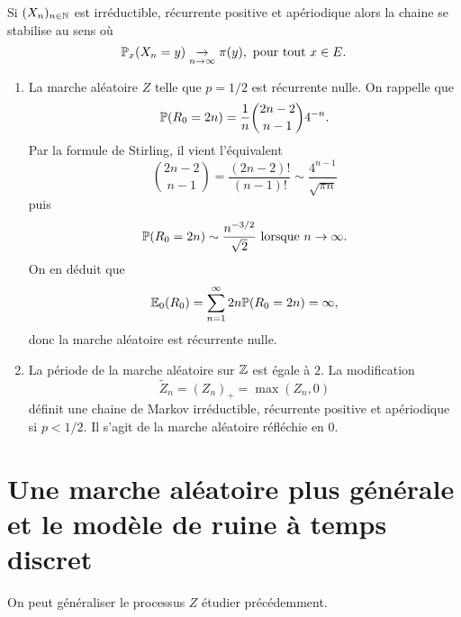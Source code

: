 \begin{theo}
Si $(X_n)_{n\in\mathbb{N}}$ est irréductible, récurrente positive et apériodique alors la chaine se stabilise au sens où
$$
\mathbb{P}_x(X_n = y)\underset{n\rightarrow \infty}{\rightarrow} \pi(y),\text{ pour tout }x\in E.
$$
\end{theo}
\begin{remark}
\begin{enumerate}
\item La marche aléatoire $Z$ telle que $p=1/2$ est récurrente nulle. On rappelle que 
$$
\mathbb{P}(R_0 = 2n) =\frac{1}{n}\binom{2n-2}{n-1}4^{-n}.
$$
Par la formule de Stirling, il vient l'équivalent 
$$
\binom{2n-2}{n-1} = \frac{(2n-2)!}{(n-1)!}\sim \frac{4^{n-1}}{\sqrt{\pi n}}
$$
puis
$$
\mathbb{P}(R_0 = 2n)\sim \frac{n^{-3/2}}{\sqrt{2}}\text{ lorsque }n\rightarrow \infty.
$$
On en déduit que 
$$
\mathbb{E}_0(R_0) = \sum_{n =1}^{\infty} 2n\mathbb{P}(R_0 = 2n)=\infty,
$$
donc la marche aléatoire est récurrente nulle.
\item La période de la marche aléatoire sur $\mathbb{Z}$ est égale à $2$. La modification 
$$
\widetilde{Z}_n = (Z_n)_+ = \max(Z_n, 0)
$$
définit une chaine de Markov irréductible, récurrente positive et apériodique si $p <  1/2$. Il s'agit de la marche aléatoire réfléchie en $0$.
\end{enumerate}
\end{remark}

\section{Une marche aléatoire plus générale et le modèle de ruine à temps discret}\label{sec:ruin_discret}
On peut généraliser le processus $Z$ étudier précédemment. 
